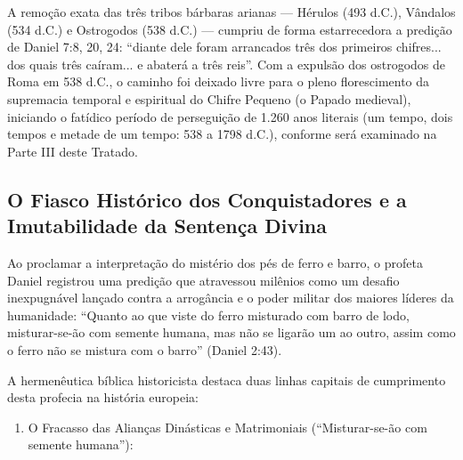 A remoção exata das três tribos bárbaras arianas — Hérulos (493 d.C.), Vândalos (534 d.C.) e Ostrogodos (538 d.C.) — cumpriu de forma estarrecedora a predição de Daniel 7:8, 20, 24: ``diante dele foram arrancados três dos primeiros chifres... dos quais três caíram... e abaterá a três reis''.
Com a expulsão dos ostrogodos de Roma em 538 d.C., o caminho foi deixado livre para o pleno florescimento da supremacia temporal e espiritual do Chifre Pequeno (o Papado medieval), iniciando o fatídico período de perseguição de 1.260 anos literais (um tempo, dois tempos e metade de um tempo: 538 a 1798 d.C.), conforme será examinado na Parte III deste Tratado.


\subsection{O Fiasco Histórico dos Conquistadores e a Imutabilidade da Sentença Divina}


Ao proclamar a interpretação do mistério dos pés de ferro e barro, o profeta Daniel registrou uma predição que atravessou milênios como um desafio inexpugnável lançado contra a arrogância e o poder militar dos maiores líderes da humanidade:
``Quanto ao que viste do ferro misturado com barro de lodo, misturar-se-ão com semente humana, mas não se ligarão um ao outro, assim como o ferro não se mistura com o barro'' (Daniel 2:43).

A hermenêutica bíblica historicista destaca duas linhas capitais de cumprimento desta profecia na história europeia:

\begin{enumerate}
  \item O Fracasso das Alianças Dinásticas e Matrimoniais (``Misturar-se-ão com semente humana''):
\end{enumerate}

